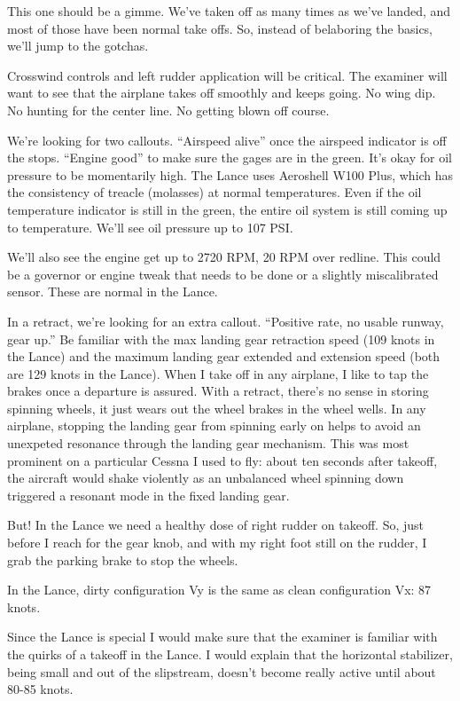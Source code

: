 This one should be a gimme. We've taken off as many times as we've landed, and most of those have been normal take offs. So, instead of belaboring the basics, we'll jump to the gotchas.

Crosswind controls and left rudder application will be critical. The examiner will want to see that the airplane takes off smoothly and keeps going. No wing dip. No hunting for the center line. No getting blown off course.

We're looking for two callouts. ``Airspeed alive'' once the airspeed indicator is off the stops. ``Engine good'' to make sure the gages are in the green. It's okay for oil pressure to be momentarily high. The Lance uses Aeroshell W100 Plus, which has the consistency of treacle (molasses) at normal temperatures. Even if the oil temperature indicator is still in the green, the entire oil system is still coming up to temperature. We'll see oil pressure up to 107 PSI.

We'll also see the engine get up to 2720 RPM, 20 RPM over redline. This could be a governor or engine tweak that needs to be done or a slightly miscalibrated sensor. These are normal in the Lance.

In a retract, we're looking for an extra callout. ``Positive rate, no usable runway, gear up.'' Be familiar with the max landing gear retraction speed (109 knots in the Lance) and the maximum landing gear extended and extension speed (both are 129 knots in the Lance). When I take off in any airplane, I like to tap the brakes once a departure is assured. With a retract, there's no sense in storing spinning wheels, it just wears out the wheel brakes in the wheel wells. In any airplane, stopping the landing gear from spinning early on helps to avoid an unexpeted resonance through the landing gear mechanism. This was most prominent on a particular Cessna I used to fly: about ten seconds after takeoff, the aircraft would shake violently as an unbalanced wheel spinning down triggered a resonant mode in the fixed landing gear.

But! In the Lance we need a healthy dose of right rudder on takeoff. So, just before I reach for the gear knob, and with my right foot still on the rudder, I grab the parking brake to stop the wheels.

In the Lance, dirty configuration Vy is the same as clean configuration Vx: 87 knots.

Since the Lance is special I would make sure that the examiner is familiar with the quirks of a takeoff in the Lance. I would explain that the horizontal stabilizer, being small and out of the slipstream, doesn't become really active until about 80-85 knots.

